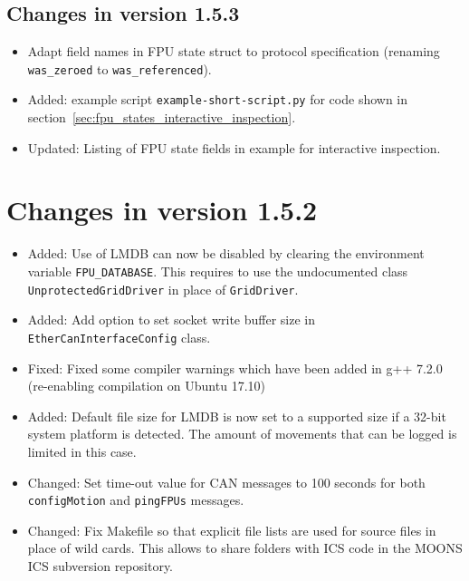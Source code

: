 \documentclass[fontsize=12,a4paper]{scrreprt}
\begin{document}
\subsection*{Changes in version 1.5.3}

\begin{itemize}
\item Adapt field names in FPU state struct to protocol specification
  (renaming \texttt{was\_zeroed} to \texttt{was\_referenced}).
\item Added: example script \texttt{example-short-script.py} for code shown in
  section~\ref{sec:fpu_states_interactive_inspection}.
\item Updated: Listing of FPU state fields in example for interactive inspection.
\end{itemize}


\section*{Changes in version 1.5.2}
\begin{itemize}
\item Added: Use of LMDB can now be disabled by clearing the
  environment variable \texttt{FPU\_DATABASE}.  This requires to use
  the undocumented class \texttt{UnprotectedGridDriver} in place of
  \texttt{GridDriver}.

\item Added: Add option to set socket write buffer size in \texttt{EtherCanInterfaceConfig} class.

\item Fixed: Fixed some compiler warnings which have been added in g++ 7.2.0 (re-enabling compilation on Ubuntu 17.10)

\item Added: Default file size for LMDB is now set to a supported size if a 32-bit system platform is detected.
  The amount of movements that can be logged is limited in this case.

\item Changed: Set time-out value for CAN messages to 100 seconds for
  both \texttt{configMotion} and \texttt{pingFPUs} messages.

\item Changed: Fix Makefile so that explicit file lists are used for
  source files in place of wild cards. This allows to share folders
  with ICS code in the MOONS ICS subversion repository.

\end{itemize}
\end{document}
